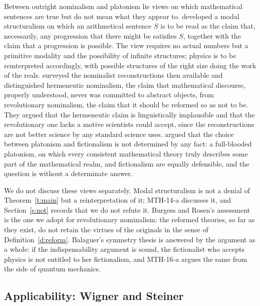 \documentclass{situationist-preprint}
\begin{document}
Between outright nominalism and platonism lie views on which mathematical sentences are true but do not mean what they appear to. \citet{Hellman1989} developed a modal structuralism on which an arithmetical sentence $S$ is to be read as the claim that, necessarily, any progression that there might be satisfies $S$, together with the claim that a progression is possible. The view requires no actual numbers but a primitive modality and the possibility of infinite structures; physics is to be reinterpreted accordingly, with possible structures of the right size doing the work of the reals. \citet{BurgessRosen1997} surveyed the nominalist reconstructions then available and distinguished hermeneutic nominalism, the claim that mathematical discourse, properly understood, never was committed to abstract objects, from revolutionary nominalism, the claim that it should be reformed so as not to be. They argued that the hermeneutic claim is linguistically implausible and that the revolutionary one lacks a motive scientists could accept, since the reconstructions are not better science by any standard science uses. \citet{Balaguer1998} argued that the choice between platonism and fictionalism is not determined by any fact: a full-blooded platonism, on which every consistent mathematical theory truly describes some part of the mathematical realm, and fictionalism are equally defensible, and the question is without a determinate answer.

We do not discuss these views separately. Modal structuralism is not a denial of Theorem~\ref{t:main} but a reinterpretation of it; MTH-14-a discusses it, and Section~\ref{s:not} records that we do not refute it. Burgess and Rosen's assessment is the one we adopt for revolutionary nominalism: the reformed theories, so far as they exist, do not retain the virtues of the originals in the sense of Definition~\ref{d:reform}. Balaguer's symmetry thesis is answered by the argument as a whole: if the indispensability argument is sound, the fictionalist who accepts physics is not entitled to her fictionalism, and MTH-16-a argues the same from the side of quantum mechanics.

\subsection{Applicability: Wigner and Steiner}
\end{document}

